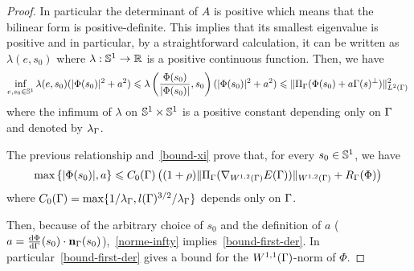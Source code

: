 \begin{proof}
\par In particular the determinant of $A$ is positive which means that the bilinear form  is positive-definite.  This implies  that its smallest eigenvalue is positive and in particular, by a straightforward calculation, it can be written as $\lambda\left(e,s_0\right)$ where   $\lambda:\mathbb{S}^1\rightarrow {\mathbb R}$ is a positive continuous function. Then, we have
\begin{equation}\label{case1}
\underset{e,s_0\in \mathbb{S}^1}{\inf}\,\lambda(e, s_0)(|\Phi(s_0)|^2+a^2) \leqslant \lambda\left(\frac{\Phi(s_0)}{|\Phi(s_0)|},s_0\right)(|\Phi(s_0)|^2+a^2)\leqslant \|\Pi_\Gamma(\Phi(s_0)+ a\Gamma(s)^\bot)\|_{L^2(\Gamma)}^2\,
\end{equation}
where the infimum of $\lambda$ on $\mathbb{S}^1\times\mathbb{S}^1$ is a positive constant depending only on $\Gamma$ and denoted by $\lambda_\Gamma$. 
\par The previous relationship and~\eqref{bound-xi} prove that, for every $s_0\in \mathbb{S}^1$, we have 
\begin{equation}\label{norme-infty}
	\mbox{max}\left\{|\Phi(s_0)|,a\right\}
	\leqslant C_0(\Gamma)\left((1+\rho)\|\Pi_\Gamma(\nabla_{W^{1,2}(\Gamma)}E(\Gamma))\|_{W^{1,2}(\Gamma)}+ R_\Gamma(\Phi)\right)\,
\end{equation}
where $C_0(\Gamma)=\mbox{max}\{1/\lambda_\Gamma, l(\Gamma)^{3/2}/\lambda_\Gamma\}$ depends only on $\Gamma$.

Then, because of the arbitrary choice of $s_0$ and the definition of $a$ ($a=\frac{\mathrm{d}\Phi}{\mathrm{d}\Gamma}(s_0)\cdot \mathbf{n}_\Gamma(s_0)$),~\eqref{norme-infty}      implies~\eqref{bound-first-der}. In particular~\eqref{bound-first-der}  gives a bound for the $W^{1,1}(\Gamma)$-norm of $\Phi$. 


\end{proof}

